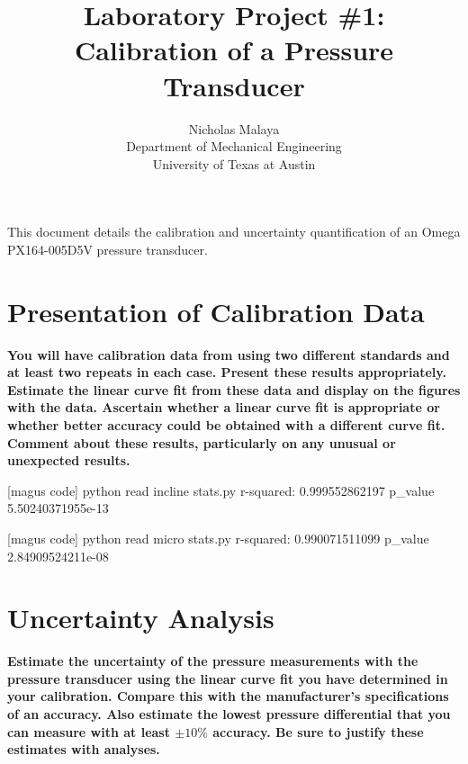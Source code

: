 \documentclass{article}
\title{\bf{Laboratory Project \#1: Calibration of a Pressure Transducer}}
\author{Nicholas Malaya \\ Department of Mechanical Engineering \\ University of Texas at Austin} \date{}
\begin{document}
\maketitle
\date{}

This document details the calibration and uncertainty quantification of
an Omega PX164-005D5V pressure transducer. 

\section{Presentation of Calibration Data}

\textbf{You will have calibration data from using two different
standards and at least two repeats in each case.  
Present these results appropriately. Estimate the linear curve fit from
these data and display on the figures with the data.  
Ascertain whether a linear curve fit is appropriate or whether better
accuracy could be obtained with a different curve fit. Comment about
these results, particularly on any unusual or unexpected results.}  


[magus code] python read incline stats.py 
r-squared: 0.999552862197
p\_value 5.50240371955e-13

[magus code] python read micro stats.py 
r-squared: 0.990071511099
p\_value 2.84909524211e-08

\newpage
\section{Uncertainty Analysis}

\textbf{Estimate the uncertainty of the pressure measurements with the
pressure transducer using the linear curve fit you have determined in
your calibration. Compare this with the manufacturer's specifications of
an accuracy. Also estimate the lowest pressure differential that you can
measure with at least $\pm 10\%$ accuracy. Be sure to justify these
estimates with analyses.}
\end{document}
